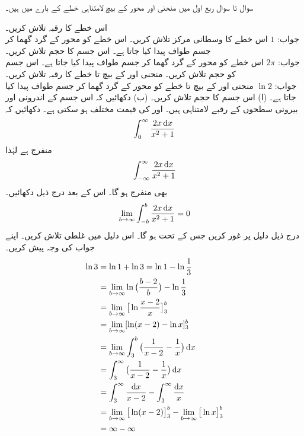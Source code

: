سوال  تا سوال  ربع اول میں منحنی  اور محور  کے بیچ لامتناہی خطے کے بارے میں ہیں۔

اس خطے کا رقبہ تلاش کریں۔\\
جواب:\quad
$1$
اس خطے کا وسطانی مرکز تلاش کریں۔
اس خطے کو محور  کے گرد گھما کر جسم طواف پیدا کیا جاتا ہے۔ اس جسم کا حجم تلاش کریں۔\\
جواب:\quad
$2\pi$
اس خطے کو محور  کے گرد گھما کر جسم طواف پیدا کیا جاتا ہے۔ اس جسم کو حجم تلاش کریں۔
منحنی  اور  کے بیچ  تا  خطے کا رقبہ تلاش کریں۔\\
جواب:\quad
$\ln 2$
منحنی  اور  کے بیچ  تا  خطے کو محور  کے گرد گھما کر جسم طواف پیدا کیا جاتا ہے۔ (ا) اس جسم کا حجم تلاش کریں۔ (ب) دکھائیں کہ اس جسم کے اندرونی اور بیرونی سطحوں کے رقبے لامتناہی ہیں۔
 اور  کی قیمت مختلف ہو سکتی ہے۔ دکھائیں کہ
\begin{align*}
\int_0^{\infty}\frac{2x\dif x}{x^2+1}
\end{align*}
منفرج ہے لہٰذا
\begin{align*}
\int_{-\infty}^{\infty}\frac{2x\dif x}{x^2+1}
\end{align*}
بھی منفرج ہو گا۔ اس کے بعد درج ذیل دکھائیں۔
\begin{align*}
\lim_{b\to \infty}\int_{-b}^b\frac{2x\dif x}{x^2+1}=0
\end{align*}
درج ذیل دلیل پر غور کریں جس کے تحت   ہو گا۔ اس دلیل میں غلطی تلاش کریں۔ اپنے جواب کی وجہ پیش کریں۔
\begin{align*}
\ln 3&=\ln 1+\ln 3=\ln 1-\ln \frac{1}{3}\\
&=\lim_{b\to \infty}\ln\big(\frac{b-2}{b}\big)-\ln\frac{1}{3}\\
&=\lim_{b\to \infty}\big[\ln \frac{x-2}{x}\big]_3^b\\
&=\lim_{b\to \infty}[\ln(x-2)-\ln x]_3^b\\
&=\lim_{b\to \infty}\int_3^b\big(\frac{1}{x-2}-\frac{1}{x}\big)\dif x\\
&=\int_3^{\infty}\big(\frac{1}{x-2}-\frac{1}{x}\big)\dif x\\
&=\int_3^{\infty}\frac{\dif x}{x-2}-\int_3^{\infty}\frac{\dif x}{x}\\
&=\lim_{b\to \infty}\big[\ln(x-2)\big]_3^b-\lim_{b\to\infty}\big[\ln x\big]_3^b\\
&=\infty-\infty
\end{align*}  
